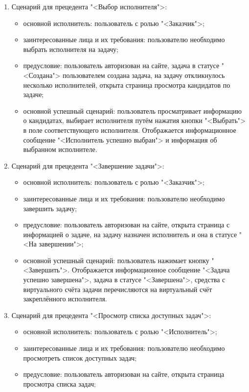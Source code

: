 \begin{enumerate}
\begin{itemize}
	\end{itemize}
\item Сценарий для прецедента "<Выбор исполнителя">:
	\begin{itemize}
		\item основной исполнитель: пользователь с ролью "<Заказчик">;
		\item заинтересованные лица и их требования: пользователю необходимо выбрать исполнителя на задачу;
		\item предусловие: пользователь авторизован на сайте, задача в статусе "<Создана"> пользователем создана задача, на задачу откликнулось несколько исполнителей, открыта страница просмотра кандидатов по задаче;
		\item основной успешный сценарий: пользователь просматривает информацию о кандидатах, выбирает исполнителя путём нажатия кнопки "<Выбрать"> в поле соответствующего исполнителя. Отображается информационное сообщение "<Исполнитель успешно выбран"> и информация об выбранном исполнителе.
	\end{itemize}
\item Сценарий для прецедента "<Завершение задачи">:
	\begin{itemize}
		\item основной исполнитель: пользователь с ролью "<Заказчик">;
		\item заинтересованные лица и их требования: пользователю необходимо завершить задачу;
		\item предусловие: пользователь авторизован на сайте, открыта страница с информацией о задаче, на задачу назначен исполнитель и она в статусе "<На завершении">;
		\item основной успешный сценарий: пользователь нажимает кнопку "<Завершить">. Отображается информационное сообщение "<Задача успешно завершена">, задача в статусе "<Завершена">, средства с виртуального счёта задачи перечисляются на виртуальный счёт закреплённого исполнителя.
	\end{itemize}
\item Сценарий для прецедента "<Просмотр списка доступных задач">:
	\begin{itemize}
		\item основной исполнитель: пользователь с ролью "<Исполнитель">;
		\item заинтересованные лица и их требования: пользователю необходимо просмотреть список доступных задач;
		\item предусловие: пользователь авторизован на сайте, открыта страница просмотра списка задач;

\end{itemize}
\end{enumerate}

